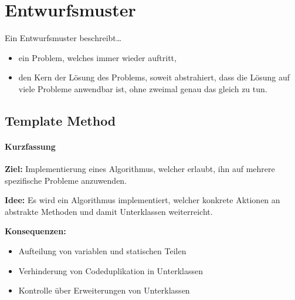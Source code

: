 \documentclass[a4paper, 11pt, accentcolor = tud3b]{tudreport}
\begin{document}
		\section{Entwurfsmuster}
			Ein Entwurfsmuster beschreibt\dots
			\begin{itemize}
				\item ein Problem, welches immer wieder auftritt,
				\item den Kern der Lösung des Problems, soweit abstrahiert, dass die Lösung auf viele Probleme anwendbar ist, ohne zweimal genau das gleich zu tun.
			\end{itemize}

			\subsection{Template Method}
				\paragraph{Kurzfassung}
					\textbf{Ziel:} Implementierung eines Algorithmus, welcher erlaubt, ihn auf mehrere spezifische Probleme anzuwenden.
					
					\textbf{Idee:} Es wird ein Algorithmus implementiert, welcher konkrete Aktionen an abstrakte Methoden und damit Unterklassen weiterreicht.
					
					\textbf{Konsequenzen:}
						\begin{itemize}
							\item Aufteilung von variablen und statischen Teilen
							\item Verhinderung von Codeduplikation in Unterklassen
							\item Kontrolle über Erweiterungen von Unterklassen
						\end{itemize}
				
\end{document}
